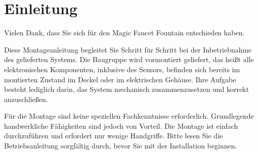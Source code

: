 %
%
%

\chapter{Einleitung}
Vielen Dank, dass Sie sich für den Magic Faucet Fountain entschieden haben.

Diese Montageanleitung begleitet Sie Schritt für Schritt bei der Inbetriebnahme des gelieferten Systems. Die Baugruppe wird vormontiert geliefert, das heißt alle elektronischen Komponenten, inklusive des Sensors, befinden sich bereits im montierten Zustand im Deckel oder im elektrischen Gehäuse. Ihre Aufgabe besteht lediglich darin, das System mechanisch zusammenzusetzen und korrekt anzuschließen.

Für die Montage sind keine speziellen Fachkenntnisse erforderlich. Grundlegende handwerkliche Fähigkeiten sind jedoch von Vorteil. Die Montage ist einfach durchzuführen und erfordert nur wenige Handgriffe. Bitte lesen Sie die Betriebsanleitung sorgfältig durch, bevor Sie mit der Installation beginnen.

\vspace{2em}

\noindent{}

